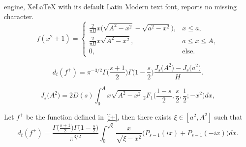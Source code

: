 \documentclass[10pt,a4paper]{amsart}
\begin{document}
engine, XeLaTeX with its default Latin Modern text font, reports no missing character.
\begin{equation} \label{f+}
f(x^2+1)= 
\begin{cases}
{\frac{2}{\pi H}x \Big(\sqrt{A^2-x^2}-\sqrt{a^2-x^2}\Big)}, & x \le a, \\ 
{\frac{2}{\pi H}x\sqrt{A^2-x^2}}, & a \le x \le A, \\
0, & \text{else}.
\end{cases} 
\end{equation}

\begin{equation}\label{Jdiff}
d_t(f^{+})=\pi^{-3/2} \Gamma\Big(\frac{s+1}{2}\Big)\Gamma\Big(1-\frac{s}{2}\Big)\frac{J_s\big(A^2\big)-J_s\big(a^2\big)}{H}.
\end{equation}

\begin{equation}\label{Js}
    J_s\big(A^2\big)=2D(s)\int_0^Ax\sqrt{A^2-x^2}\;  {}_2F_1\Big(\frac{1-s}{2},\frac{s}{2},\frac{1}{2};-x^2\Big)dx,
\end{equation}

\begin{lem}\label{lem19}
Let $f^{+}$ be the function defined in \eqref{f+}, then there exists $\xi \in [a^2,A^2]$ such that
$$d_t(f^{+})= \frac{\Gamma \big(\frac{s+1}{2}\big)\Gamma \big(1-\frac{s}{2}\big)}{\pi^{3/2}}\int_0^{\sqrt{\xi}}\frac{x}{\sqrt{\xi-x^2}}\big(P_{s-1}(ix)+P_{s-1}(-ix)\big)dx.$$
\end{lem}
\end{document}

